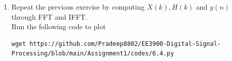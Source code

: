 \documentclass[journal,12pt,twocolumn]{IEEEtran}
\renewcommand\thesection{\arabic{section}}
\begin{document}
\begin{enumerate}[label=\thesection.\arabic*]
%

	\item Repeat the previous exercise by computing $X(k), H(k)$ and $y(n)$ through FFT and 
	IFFT.\\
	\solution 
	Run the following code to plot 
	\begin{lstlisting}
wget https://github.com/Pradeep8802/EE3900-Digital-Signal-Processing/blob/main/Assignment1/codes/6.4.py
	\end{lstlisting}
	

\end{enumerate}
\end{document}
